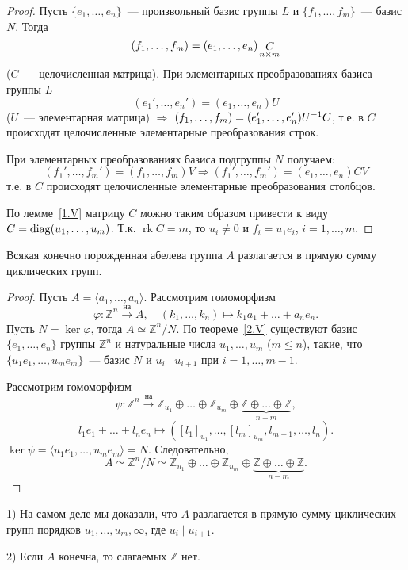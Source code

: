\documentclass[a4paper]{article}
\renewcommand{\rk}{\mathop{\mathrm{rk}}\nolimits}
\renewcommand{\diag}{\mathop{\mathrm{diag}}\nolimits}
\newcommand*{\p}[1]{#1\nobreak\discretionary{}{\hbox{$\mathsurround=0pt #1$}}{}}
\begin{document}
\begin{proof}
Пусть $\{e_1,\ldots,e_n\}$~--- произвольный базис группы $L$ и
$\{f_1,\ldots,f_m\}$~--- базис $N$. Тогда
$$(f_1,\ldots,f_m)\p=(e_1,\ldots,e_n)\mathop{C}\limits_{n\times m}$$
($C$~--- целочисленная матрица). При элементарных преобразованиях
базиса группы $L$ $$(e_1',\ldots,e_n')=(e_1,\ldots,e_n)U$$ ($U$~---
элементарная матрица) $\Rightarrow$
$(f_1,\ldots,f_m)\p=(e_1',\ldots,e_n')U^{-1}C$, т.е. в $C$
происходят целочисленные элементарные преобразования строк.

При элементарных преобразованиях базиса подгруппы $N$ получаем:
$$(f_1',\ldots,f_m')=(f_1,\ldots,f_m)V \Rightarrow
(f_1',\ldots,f_m')=(e_1,\ldots,e_n)CV$$
т.е. в $C$ происходят целочисленные элементарные преобразования
столбцов.

По лемме~\ref{1.V} матрицу $C$ можно таким образом привести к виду
$C\p=\diag(u_1,\ldots,u_m)$. Т.к. $\rk C=m$, то $u_i\neq 0$ и
$f_i=u_1e_i$, $i=1,\ldots,m$.
\end{proof}

\begin{theorem}
Всякая конечно порожденная абелева группа $A$ разлагается в прямую
сумму циклических групп.
\end{theorem}

\begin{proof}
Пусть $A=\langle a_1,\ldots,a_n\rangle$. Рассмотрим гомоморфизм
$$\varphi\colon \mathbb{Z}^n\stackrel{\text{на}}{\to}A,\quad
(k_1,\ldots,k_n)\mapsto k_1a_1+\ldots+a_ne_n.$$ Пусть $N=\ker
\varphi$, тогда $A\simeq \mathbb{Z}^n/N$. По теореме~\ref{2.V}
существуют базис $\{e_1,\ldots,e_n\}$ группы $\mathbb{Z}^n$ и
натуральные числа $u_1,\ldots,u_m$ ($m\leqslant n$), такие, что
$\{u_1e_1,\ldots,u_me_m\}$~--- базис $N$ и $u_i\mid u_{i+1}$ при
$i=1,\ldots,m-1$.

Рассмотрим гомоморфизм
$$\psi\colon\mathbb{Z}^n\stackrel{\text{на}}{\to}\mathbb{Z}_{u_1}
\oplus\ldots\oplus\mathbb{Z}_{u_m}\oplus\underbrace{\mathbb{Z}
\oplus\ldots\oplus\mathbb{Z}}_{n-m},$$ $$l_1e_1+\ldots+l_ne_n\mapsto
([l_1]_{u_1},\ldots,[l_m]_{u_m},l_{m+1},\ldots,l_n).$$
$\ker\psi=\langle u_1e_1,\ldots,u_me_m\rangle=N$. Следовательно,
$$A\simeq\mathbb{Z}^n/N\simeq\mathbb{Z}_{u_1}
\oplus\ldots\oplus\mathbb{Z}_{u_m}\oplus\underbrace{\mathbb{Z}
\oplus\ldots\oplus\mathbb{Z}}_{n-m}.$$
\end{proof}

\begin{note}
1) На самом деле мы доказали, что $A$ разлагается в прямую сумму
циклических групп порядков $u_1,\ldots,u_m,\infty$, где $u_i\mid
u_{i+1}$.

2) Если $A$ конечна, то слагаемых $\mathbb{Z}$ нет.
\end{note}
\end{document}
